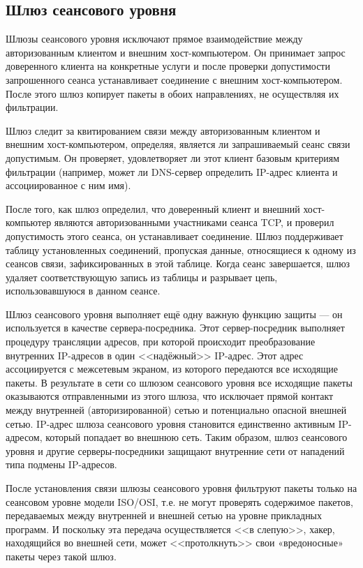 \subsection{Шлюз сеансового уровня }
Шлюзы сеансового уровня исключают прямое взаимодействие между
авторизованным клиентом и внешним хост-компьютером. Он принимает
запрос доверенного клиента на конкретные услуги и после проверки
допустимости запрошенного сеанса устанавливает соединение с внешним
хост-компьютером. После этого шлюз копирует пакеты в обоих
направлениях, не осуществляя их фильтрации.

Шлюз следит за квитированием связи между авторизованным клиентом и
внешним хост-компьютером, определяя, является ли запрашиваемый сеанс
связи допустимым. Он проверяет, удовлетворяет ли этот клиент базовым
критериям фильтрации (например, может ли DNS-сервер определить
IP-адрес клиента и ассоциированное с ним имя).

После того, как шлюз определил, что доверенный клиент и внешний
хост-компьютер являются авторизованными участниками сеанса TCP, и
проверил допустимость этого сеанса, он устанавливает соединение. Шлюз
поддерживает таблицу установленных соединений, пропуская данные,
относящиеся к одному из сеансов связи, зафиксированных в этой
таблице. Когда сеанс завершается, шлюз удаляет соответствующую запись
из таблицы и разрывает цепь, использовавшуюся в данном сеансе.

Шлюз сеансового уровня выполняет ещё одну важную функцию защиты --- он
используется в качестве сервера-посредника. Этот сервер-посредник
выполняет процедуру трансляции адресов, при которой происходит
преобразование внутренних IP-адресов в один <<надёжный>> IP-адрес. Этот
адрес ассоциируется с межсетевым экраном, из которого передаются все
исходящие пакеты. В результате в сети со шлюзом сеансового уровня все
исходящие пакеты оказываются отправленными из этого шлюза, что
исключает прямой контакт между внутренней (авторизированной) сетью и
потенциально опасной внешней сетью. IP-адрес шлюза сеансового уровня
становится единственно активным IP-адресом, который попадает во
внешнюю сеть. Таким образом, шлюз сеансового уровня и другие
серверы-посредники защищают внутренние сети от нападений типа подмены
IP-адресов.

После установления связи шлюзы сеансового уровня фильтруют пакеты
только на сеансовом уровне модели ISO/OSI, т.е. не могут проверять
содержимое пакетов, передаваемых между внутренней и внешней сетью на
уровне прикладных программ. И поскольку эта передача осуществляется <<в
слепую>>, хакер, находящийся во внешней сети, может <<протолкнуть>> свои
«вредоносные» пакеты через такой шлюз.

